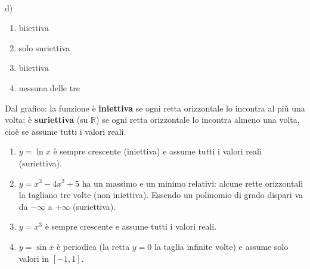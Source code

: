 \begin{question}[ID=3.1, subtitle={Classificare funzioni da grafici — serie 1}, difficulty=facile, tags={funzioni,grafici}]
\begin{center}
\begin{minipage}{0.24\textwidth}
\centering
{}
\\ d)
\end{minipage}
\end{center}
\begin{solution}
\begin{enumerate}
    \item biiettiva
    \item solo suriettiva
    \item biiettiva
    \item nessuna delle tre
\end{enumerate}
\end{solution}
\begin{explanation}
Dal grafico: la funzione è \textbf{iniettiva} se ogni retta orizzontale lo incontra al più una volta; è \textbf{suriettiva} (su $\mathbb{R}$) se ogni retta orizzontale lo incontra almeno una volta, cioè se assume tutti i valori reali.
\begin{enumerate}
    \item $y=\ln x$ è sempre crescente (iniettiva) e assume tutti i valori reali (suriettiva).
    \item $y=x^3-4x^2+5$ ha un massimo e un minimo relativi: alcune rette orizzontali la tagliano tre volte (non iniettiva). Essendo un polinomio di grado dispari va da $-\infty$ a $+\infty$ (suriettiva).
    \item $y=x^3$ è sempre crescente e assume tutti i valori reali.
    \item $y=\sin x$ è periodica (la retta $y=0$ la taglia infinite volte) e assume solo valori in $[-1,1]$.
\end{enumerate}
\end{explanation}
\end{question}


